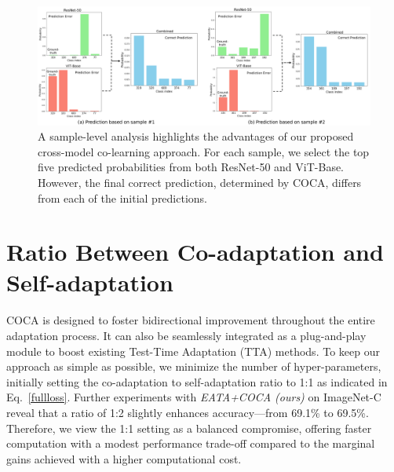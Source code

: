 \begin{figure}[t]
\centering
    \includegraphics[width=0.93\linewidth]{sec/samplelevelvision.pdf}
    \vspace{-0.1in}
    \caption{A sample-level analysis highlights the advantages of our proposed cross-model co-learning approach. For each sample, we select the top five predicted probabilities from both ResNet-50 and ViT-Base. However, the final correct prediction, determined by COCA, differs from each of the initial predictions.}
    \vspace{-0.1in}
\label{samplelevel}
\end{figure}


\section{Ratio Between Co-adaptation and Self-adaptation}
\label{Ratio}
COCA is designed to foster bidirectional improvement throughout the entire adaptation process. It can also be seamlessly integrated as a plug-and-play module to boost existing Test-Time Adaptation (TTA) methods. To keep our approach as simple as possible, we minimize the number of hyper-parameters, initially setting the co-adaptation to self-adaptation ratio to 1:1 as indicated in Eq.~\ref{fullloss}. Further experiments with \textit{EATA+COCA (ours)} on ImageNet-C reveal that a ratio of 1:2 slightly enhances accuracy—from 69.1\% to 69.5\%. Therefore, we view the 1:1 setting as a balanced compromise, offering faster computation with a modest performance trade-off compared to the marginal gains achieved with a higher computational cost.


